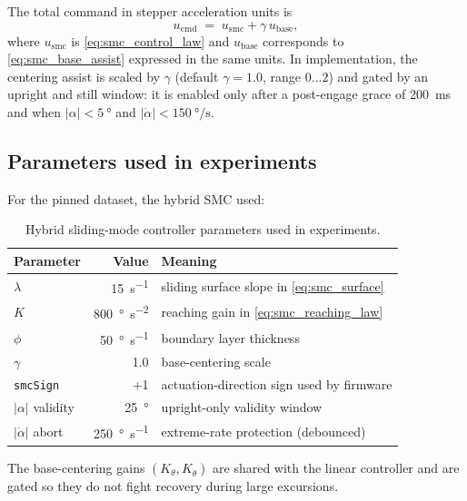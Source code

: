 The total command in stepper acceleration units is
\[
u_{\mathrm{cmd}} \;=\; u_{\mathrm{smc}} + \gamma\,u_{\mathrm{base}},
\]
where $u_{\mathrm{smc}}$ is \eqref{eq:smc_control_law} and $u_{\mathrm{base}}$ corresponds to \eqref{eq:smc_base_assist} expressed in the same units. In implementation, the centering assist is scaled by $\gamma$ (default $\gamma=1.0$, range $0\ldots 2$) and gated by an upright and still window: it is enabled only after a post-engage grace of \SI{200}{ms} and when $|\alpha|<\SI{5}{\degree}$ and $|\dot{\alpha}|<\SI{150}{\degree\per\second}$.

\subsection{Parameters used in experiments}
For the pinned dataset, the hybrid SMC used:
\begin{table}[htbp]
  \centering
  \small
  \setlength{\tabcolsep}{5pt}
  \caption{Hybrid sliding-mode controller parameters used in experiments.}
  \label{tab:smc_params}
  \begin{tabular}{lrl}
    \toprule
    Parameter & Value & Meaning \\
    \midrule
    $\lambda$ & 15\ \si{s^{-1}} & sliding surface slope in \eqref{eq:smc_surface} \\
    $K$ & 800\ \si{\degree\per\second\squared} & reaching gain in \eqref{eq:smc_reaching_law} \\
    $\phi$ & 50\ \si{\degree\per\second} & boundary layer thickness \\
    $\gamma$ & 1.0 & base-centering scale \\
    \texttt{smcSign} & +1 & actuation-direction sign used by firmware \\
    \midrule
    $|\alpha|$ validity & \SI{25}{\degree} & upright-only validity window \\
    $|\dot{\alpha}|$ abort & \SI{250}{\degree\per\second} & extreme-rate protection (debounced) \\
    \bottomrule
  \end{tabular}
\end{table}
The base-centering gains $(K_\theta,K_{\dot{\theta}})$ are shared with the linear controller and are gated so they do not fight recovery during large excursions.

